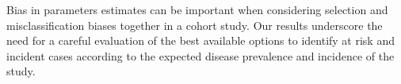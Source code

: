 Bias in parameters estimates can be important when considering selection and
misclassification biases together in a cohort study.
Our results underscore the need for a careful evaluation of the best available
options to identify at risk and incident cases according to the expected disease
prevalence and incidence of the study. 

